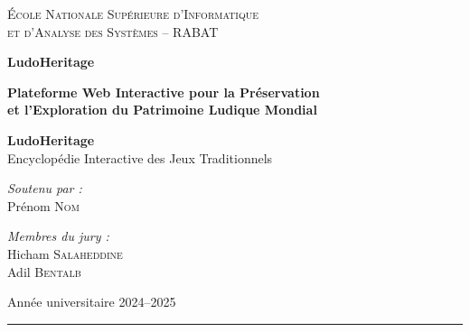 \documentclass[12pt,a4paper]{report}
\begin{document}
\begin{titlepage}
\thispagestyle{empty}
\centering
\vspace*{1cm}
{\Large\scshape École Nationale Supérieure d'Informatique\\
et d'Analyse des Systèmes -- RABAT}
\vspace{1.2cm}

{\Huge\bfseries\color{mainblue} LudoHeritage}
\vspace{0.4cm}

{\large\bfseries Plateforme Web Interactive pour la Préservation\\
et l'Exploration du Patrimoine Ludique Mondial}
\vspace{1cm}

\begin{mdframed}[linecolor=mainblue, linewidth=1.5pt,
                 innertopmargin=14pt, innerbottommargin=14pt,
                 innerleftmargin=16pt, innerrightmargin=16pt]
\centering
{\large\bfseries\color{mainblue} LudoHeritage}\\[0.2cm]
{\small\color{darkgray} Encyclopédie Interactive des Jeux Traditionnels}
\end{mdframed}

\vspace{1cm}
\begin{minipage}[t]{0.45\textwidth}
\raggedright
\textit{Soutenu par :}\\[0.3cm]
Prénom \textsc{Nom}
\end{minipage}
\hfill
\begin{minipage}[t]{0.45\textwidth}
\raggedleft
\textit{Membres du jury :}\\[0.3cm]
Hicham \textsc{Salaheddine}\\
Adil \textsc{Bentalb}
\end{minipage}
\vfill
{\large Année universitaire 2024--2025}
\end{titlepage}

\newpage
\thispagestyle{empty}

\noindent\textcolor{mainblue}{\rule{\linewidth}{1.2pt}}

\vspace*{2.5cm}
\end{document}
